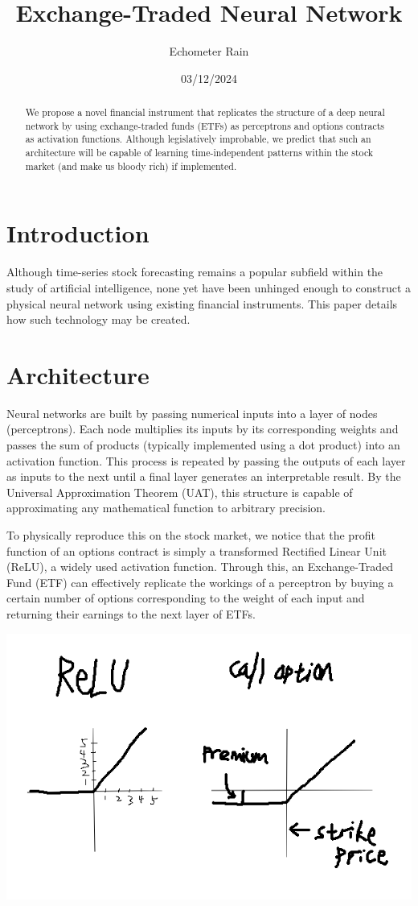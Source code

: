 \documentclass[12pt]{article}
\title{Exchange-Traded Neural Network}
\author{Echometer Rain}
\date{03/12/2024}
\begin{document}
\maketitle

\begin{abstract}
  We propose a novel financial instrument that replicates the structure of a deep neural network by using exchange-traded funds (ETFs) as perceptrons and options contracts as activation functions. Although legislatively improbable, we predict that such an architecture will be capable of learning time-independent patterns within the stock market (and make us bloody rich) if implemented.
\end{abstract}
\section{Introduction}
Although time-series stock forecasting remains a popular subfield within the study of artificial intelligence, none yet have been unhinged enough to construct a physical neural network using existing financial instruments. This paper details how such technology may be created.
\section{Architecture}
Neural networks are built by passing numerical inputs into a layer of nodes (perceptrons). Each node multiplies its inputs by its corresponding weights and passes the sum of products (typically implemented using a dot product) into an activation function. This process is repeated by passing the outputs of each layer as inputs to the next until a final layer generates an interpretable result. By the Universal Approximation Theorem (UAT), this structure is capable of approximating any mathematical function to arbitrary precision. \newline

To physically reproduce this on the stock market, we notice that the profit function of an options contract is simply a transformed Rectified Linear Unit (ReLU), a widely used activation function. Through this, an Exchange-Traded Fund (ETF) can effectively replicate the workings of a perceptron by buying a certain number of options corresponding to the weight of each input and returning their earnings to the next layer of ETFs.

\includegraphics[scale=0.8]{./relu.png}
\end{document}
